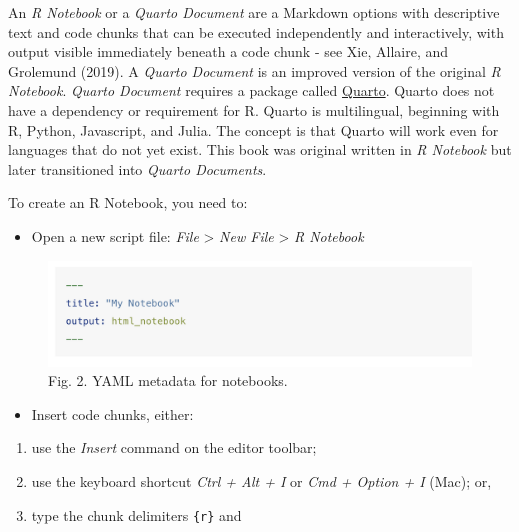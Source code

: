 \documentclass[
  letterpaper,
  DIV=11,
  numbers=noendperiod,
  oneside]{scrreprt}
\providecommand{\tightlist}{%
  \setlength{\itemsep}{0pt}\setlength{\parskip}{0pt}}\usepackage{longtable,booktabs,array}
\begin{document}
An \emph{R Notebook} or a \emph{Quarto Document} are a Markdown options
with descriptive text and code chunks that can be executed independently
and interactively, with output visible immediately beneath a code chunk
- see Xie, Allaire, and Grolemund (2019). A \emph{Quarto Document} is an
improved version of the original \emph{R Notebook}. \emph{Quarto
Document} requires a package called \href{https://quarto.org}{Quarto}.
Quarto does not have a dependency or requirement for R. Quarto is
multilingual, beginning with R, Python, Javascript, and Julia. The
concept is that Quarto will work even for languages that do not yet
exist. This book was original written in \emph{R Notebook} but later
transitioned into \emph{Quarto Documents}.

To create an R Notebook, you need to:

\begin{itemize}
\tightlist
\item
  Open a new script file: \emph{File} \textgreater{} \emph{New File}
  \textgreater{} \emph{R Notebook}
\end{itemize}

\begin{figure}[H]

{\centering \includegraphics{figs/ch2/rnotebook_yaml.png}

}

\caption{Fig. 2. YAML metadata for notebooks.}

\end{figure}%

\begin{itemize}
\tightlist
\item
  Insert code chunks, either:
\end{itemize}

\begin{enumerate}
\def\labelenumi{\arabic{enumi})}
\tightlist
\item
  use the \emph{Insert} command on the editor toolbar;
\item
  use the keyboard shortcut \emph{Ctrl + Alt + I} or \emph{Cmd + Option
  + I} (Mac); or,
\item
  type the chunk delimiters
  \texttt{\textasciigrave{}\textasciigrave{}\textasciigrave{}\{r\}} and
  \texttt{\textasciigrave{}\textasciigrave{}\textasciigrave{}}
\end{enumerate}
\end{document}
